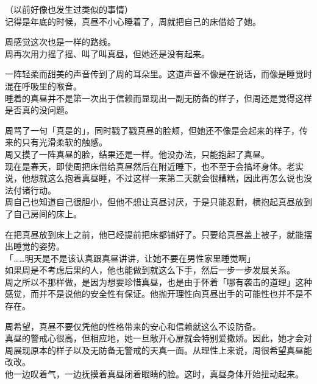（以前好像也发生过类似的事情）\\

记得是年底的时候，真昼不小心睡着了，周就把自己的床借给了她。

周感觉这次也是一样的路线。\\

周再次用力摇了摇、叫了叫真昼，但她还是没有起来。

一阵轻柔而甜美的声音传到了周的耳朵里。这道声音不像是在说话，而像是睡觉时混在呼吸里的喉音。\\

睡着的真昼并不是第一次出于信赖而显现出一副无防备的样子，但周还是觉得这样是否真的没问题。

周骂了一句「真是的」，同时戳了戳真昼的脸颊，但她还不像是会起来的样子，传来的只有光滑柔软的触感。\\

周又摸了一阵真昼的脸，结果还是一样。他没办法，只能抱起了真昼。\\

现在是春天，即使周把床借给真昼然后在附近睡下，也不至于会搞坏身体。老实说，他想就这么抱着真昼睡，不过这样一来第二天就会很糟糕，因此再怎么说也没法付诸行动。\\

周自己也知道自己很胆小，但他不想让真昼讨厌，于是只能忍耐，横抱起真昼放到了自己房间的床上。

在把真昼放到床上之前，他已经提前把床都铺好了。只要给真昼盖上被子，就能摆出睡觉的姿势。\\

「……明天是不是该认真跟真昼讲讲，让她不要在男性家里睡觉啊」\\

如果周是不考虑后果的人，他也能做到就这么下手，然后一步一步发展关系。\\

周之所以不那样做，是因为想要珍惜真昼，也是由于怀着「哪有袭击的道理」这种感觉，而并不是说他的安全性有保证。他抛开理性向真昼出手的可能性也并不是不存在。

周希望，真昼不要仅凭他的性格带来的安心和信赖就这么不设防备。\\

真昼的警戒心很高，但相应地，她一旦敞开心扉就会特别爱撒娇。因此，她才会对周展现原本的样子以及无防备无警戒的天真一面。从理性上来说，周很希望真昼能改改。\\

他一边叹着气，一边抚摸着真昼闭着眼睛的脸。这时，真昼身体开始扭动起来。\\

